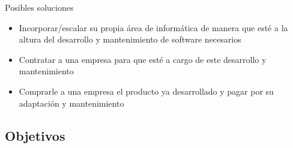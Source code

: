 \documentclass[10pt]{beamer}
\begin{document}
\begin{frame}{Posibles soluciones}
    \begin{itemize}
        \item Incorporar/escalar su propia área de informática de manera que esté a la altura del desarrollo y mantenimiento de software necesarios
        \item Contratar a una empresa para que esté a cargo de este desarrollo y mantenimiento
        \item Comprarle a una empresa el producto ya desarrollado y pagar por su adaptación y mantenimiento
    \end{itemize}
\end{frame}
\begin{comment}
Las soluciones a las que pueden recurrir las obras sociales universitarias para reducir la indicidencia de estos problemas pueden clasificarse de forma general en
- incorporar/escalar su propia área de informática de manera que esté a la altura del desarrollo y mantenimiento de software necesarios
- contratar a una empresa para que esté a cargo de este desarrollo y mantenimiento
- comprarle a una empresa el producto ya desarrollado y pagar por su adaptación y mantenimiento

Las primeras dos opciones requieren que la obra social sea propietaria del sistema en cuestión.

Por otra parte, la última opción, en principio parece ser más onerosa y rápida de concretar. Sin embargo, un mayor poder de desición por parte de los afiliados, junto con un menor tamaño de la obra social, el cual suele implicar mayor complejidad en los convenios con proveedores, resultan en una mayor complejidad en comparación con su contraparte privada. Esta complejidad adicional necesariamente incrementa los costos de adaptación y mantenimiento, reduciendo la atractividad de está opción en un contexto de recursos limitados.
\end{comment}

\subsection{Objetivos}
\end{document}
